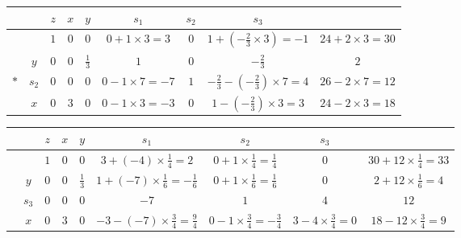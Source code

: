 \documentclass[a4paper,12pt]{article}
\begin{document}
\begin{table}[H]
    \scriptsize
    \begin{tabular}{cc|cccccc|c}
            &       & $z$ & $x$ & $y$           & $s_1$                 & $s_2$ & $s_3$                                        &                        \\
        \hline
            &       & $1$ & $0$ & $0$           & $0 + 1 \times 3 = 3$  & $0$   & $1 + (-\frac{2}{3} \times 3) = -1$           & $24 + 2 \times 3 = 30$ \\
        \hline
            & $y$   & $0$ & $0$ & $\frac{1}{3}$ & $1$                   & $0$   & $-\frac{2}{3}$                               & $2$                    \\
        $*$ & $s_2$ & $0$ & $0$ & $0$           & $0 - 1 \times 7 = -7$ & $1$   & $-\frac{2}{3} - (-\frac{2}{3}) \times 7 = 4$ & $26 - 2 \times 7 = 12$ \\
            & $x$   & $0$ & $3$ & $0$           & $0 - 1 \times 3 = -3$ & $0$   & $1 - (-\frac{2}{3}) \times 3 = 3$            & $24 - 2 \times 3 = 18$ \\
    \end{tabular}
\end{table}

\begin{table}[H]
    \scriptsize
    \begin{tabular}{cc|cccccc|c}
         &       & $z$ & $x$ & $y$           & $s_1$                                        & $s_2$                                     & $s_3$                          &                                   \\
        \hline
         &       & $1$ & $0$ & $0$           & $3 + (-4) \times \frac{1}{4} = 2$            & $0 + 1 \times \frac{1}{4} = \frac{1}{4}$  & $0$                            & $30 + 12 \times \frac{1}{4} = 33$ \\
        \hline
         & $y$   & $0$ & $0$ & $\frac{1}{3}$ & $1 + (-7) \times \frac{1}{6} = -\frac{1}{6}$ & $0 + 1 \times \frac{1}{6} = \frac{1}{6}$  & $0$                            & $2 + 12 \times \frac{1}{6} = 4$   \\
         & $s_3$ & $0$ & $0$ & $0$           & $-7$                                         & $1$                                       & $4$                            & $12$                              \\
         & $x$   & $0$ & $3$ & $0$           & $-3 - (-7) \times \frac{3}{4} = \frac{9}{4}$ & $0 - 1 \times \frac{3}{4} = -\frac{3}{4}$ & $3 - 4 \times \frac{3}{4} = 0$ & $18 - 12 \times \frac{3}{4} = 9$  \\
    \end{tabular}
\end{table}
\end{document}

